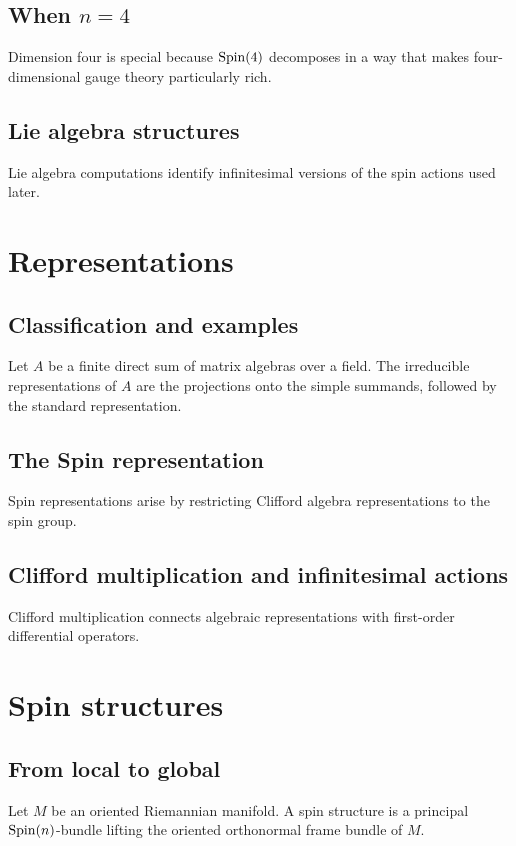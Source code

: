\subsection{When $n=4$}
Dimension four is special because $\operatorname{Spin}(4)$ decomposes in a way that makes four-dimensional gauge theory particularly rich.

\subsection{Lie algebra structures}
Lie algebra computations identify infinitesimal versions of the spin actions used later.

\section{Representations}
\subsection{Classification and examples}
\begin{theorem}
Let $A$ be a finite direct sum of matrix algebras over a field. The irreducible representations of $A$ are the projections onto the simple summands, followed by the standard representation.
\end{theorem}

\subsection{The Spin representation}
Spin representations arise by restricting Clifford algebra representations to the spin group.

\subsection{Clifford multiplication and infinitesimal actions}
Clifford multiplication connects algebraic representations with first-order differential operators.

\section{Spin structures}
\subsection{From local to global}
\begin{definition}
Let $M$ be an oriented Riemannian manifold. A spin structure is a principal $\operatorname{Spin}(n)$-bundle lifting the oriented orthonormal frame bundle of $M$.
\end{definition}


